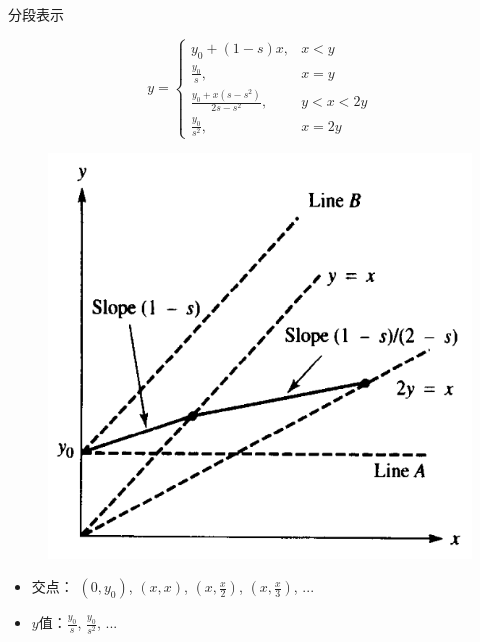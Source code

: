 \documentclass[mathserif, table]{beamer}
\begin{document}
\begin{frame}{分段表示}

  \begin{figure}
    \begin{minipage}{.5\linewidth}
      \[
      y =
      \left\{
        \begin{array}{ll}
          y_0 +(1-s)x, & x < y\\
          \frac{y_0}{s}, & x = y\\
          \frac{y_0 + x(s-s^2)}{2s - s^2}, & y < x < 2y\\
          \frac{y_0}{s^2},& x = 2y
        \end{array}
      \right.
      \]
    \end{minipage}%
    \begin{minipage}{.5\linewidth}
      \includegraphics[width=.8\textwidth]{linear.png}
    \end{minipage}
  \end{figure}

  \begin{itemize}
  \item 交点： $(0, y_0)$, $(x, x)$, $(x, \frac{x}{2})$, $(x, \frac{x}{3})$, ...
  \item $y$值：$\frac{y_0}{s}$, $\frac{y_0}{s^2}$, ...
  \end{itemize}

\end{frame}
\end{document}
